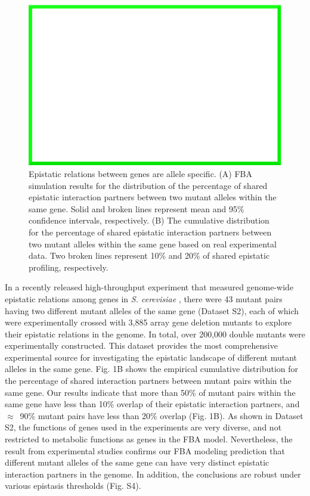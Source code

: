 \begin{figure}
\centering
\includegraphics[width=\textwidth]{dummy}
\caption{Epistatic relations between genes are allele specific. (A)
FBA simulation results for the distribution of the percentage of
shared epistatic interaction partners between two mutant alleles
within the same gene. Solid and broken lines represent mean and 95\%
confidence intervals, respectively. (B) The cumulative distribution
for the percentage of shared epistatic interaction partners between
two mutant alleles within the same gene based on real experimental
data. Two broken lines represent 10\% and 20\% of shared epistatic
profiling, respectively.}
\label{fig:alleleSpecific}
\end{figure}

In a recently released high-throughput experiment that measured
genome-wide epistatic relations among genes in \textit{S. cerevisiae} \citep{Costanzo2010},
there were 43 mutant pairs having two different mutant alleles of the
same gene (Dataset S2), each of which were experimentally crossed with
3,885 array gene deletion mutants to explore their epistatic relations
in the genome. In total, over 200,000 double mutants were
experimentally constructed. This dataset provides the most
comprehensive experimental source for investigating the epistatic
landscape of different mutant alleles in the same gene. Fig. 1B shows
the empirical cumulative distribution for the percentage of shared
interaction partners between mutant pairs within the same gene. Our
results indicate that more than 50\% of mutant pairs within the same
gene have less than 10\% overlap of their epistatic interaction
partners, and $\approx$~90\% mutant pairs have less than 20\% overlap
(Fig. 1B). As shown in Dataset S2, the functions of genes used in the
experiments are very diverse, and not restricted to metabolic
functions as genes in the FBA model. Nevertheless, the result from
experimental studies confirms our FBA modeling prediction that
different mutant alleles of the same gene can have very distinct
epistatic interaction partners in the genome. In addition, the
conclusions are robust under various epistasis thresholds (Fig. S4).

